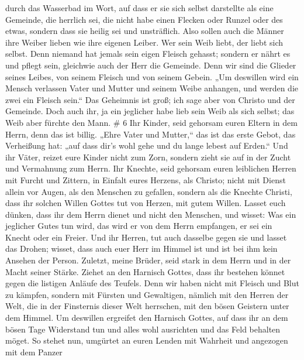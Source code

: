 durch das Wasserbad im Wort,  auf dass er sie sich selbst
darstellte als eine Gemeinde, die herrlich sei, die nicht habe einen
Flecken oder Runzel oder des etwas, sondern dass sie heilig sei und
unsträflich.  Also sollen auch die Männer ihre Weiber
lieben wie ihre eigenen Leiber. Wer sein Weib liebt, der liebt sich
selbst.  Denn niemand hat jemals sein eigen Fleisch
gehasst; sondern er nährt es und pflegt sein, gleichwie auch der Herr
die Gemeinde.  Denn wir sind die Glieder seines Leibes, von
seinem Fleisch und von seinem Gebein.  „Um deswillen wird
ein Mensch verlassen Vater und Mutter und seinem Weibe anhangen, und
werden die zwei ein Fleisch sein.``  Das Geheimnis ist
groß; ich sage aber von Christo und der Gemeinde.  Doch
auch ihr, ja ein jeglicher habe lieb sein Weib als sich selbst; das Weib
aber fürchte den Mann. \# 6  Ihr Kinder, seid gehorsam euren
Eltern in dem Herrn, denn das ist billig.  „Ehre Vater und
Mutter,`` das ist das erste Gebot, das Verheißung hat:  „auf
dass dir's wohl gehe und du lange lebest auf Erden.``  Und
ihr Väter, reizet eure Kinder nicht zum Zorn, sondern zieht sie auf in
der Zucht und Vermahnung zum Herrn.  Ihr Knechte, seid
gehorsam euren leiblichen Herren mit Furcht und Zittern, in Einfalt
eures Herzens, als Christo;  nicht mit Dienst allein vor
Augen, als den Menschen zu gefallen, sondern als die Knechte Christi,
dass ihr solchen Willen Gottes tut von Herzen, mit gutem Willen.
 Lasset euch dünken, dass ihr dem Herrn dienet und nicht den
Menschen,  und wisset: Was ein jeglicher Gutes tun wird, das
wird er von dem Herrn empfangen, er sei ein Knecht oder ein Freier.
 Und ihr Herren, tut auch dasselbe gegen sie und lasset das
Drohen; wisset, dass auch euer Herr im Himmel ist und ist bei ihm kein
Ansehen der Person.  Zuletzt, meine Brüder, seid stark in
dem Herrn und in der Macht seiner Stärke.  Ziehet an den
Harnisch Gottes, dass ihr bestehen könnet gegen die listigen Anläufe des
Teufels.  Denn wir haben nicht mit Fleisch und Blut zu
kämpfen, sondern mit Fürsten und Gewaltigen, nämlich mit den Herren der
Welt, die in der Finsternis dieser Welt herrschen, mit den bösen
Geistern unter dem Himmel.  Um deswillen ergreifet den
Harnisch Gottes, auf dass ihr an dem bösen Tage Widerstand tun und alles
wohl ausrichten und das Feld behalten möget.  So stehet
nun, umgürtet an euren Lenden mit Wahrheit und angezogen mit dem Panzer
